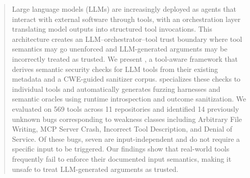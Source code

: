 \begin{abstract}
Large language models (LLMs) are increasingly deployed as agents that interact with external software through tools, with an orchestration layer translating model outputs into structured tool invocations.
This architecture creates an LLM--orchestrator--tool trust boundary where tool semantics may go unenforced and LLM-generated arguments may be incorrectly treated as trusted.
We present \project{}, a tool-aware framework that derives semantic security checks for LLM tools from their existing metadata and a CWE-guided sanitizer corpus.
\project{} specializes these checks to individual tools and automatically generates fuzzing harnesses and semantic oracles using runtime introspection and outcome sanitization.
We evaluated \project{} on 569 tools across 11 repositories and identified 14 previously unknown bugs corresponding to weakness classes including Arbitrary File Writing, MCP Server Crash, Incorrect Tool Description, and Denial of Service. Of these bugs, seven are input-independent and do not require a specific input to be triggered.
Our findings show that real-world tools frequently fail to enforce their documented input semantics, making it unsafe to treat LLM-generated arguments as trusted.

\end{abstract}